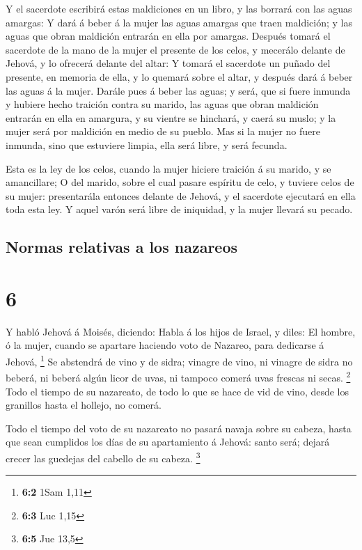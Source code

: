  Y el sacerdote escribirá estas maldiciones en un libro, y
las borrará con las aguas amargas:  Y dará á beber á la
mujer las aguas amargas que traen maldición; y las aguas que obran
maldición entrarán en ella por amargas.  Después tomará el
sacerdote de la mano de la mujer el presente de los celos, y mecerálo
delante de Jehová, y lo ofrecerá delante del altar:  Y
tomará el sacerdote un puñado del presente, en memoria de ella, y lo
quemará sobre el altar, y después dará á beber las aguas á la mujer.
 Darále pues á beber las aguas; y será, que si fuere
inmunda y hubiere hecho traición contra su marido, las aguas que obran
maldición entrarán en ella en amargura, y su vientre se hinchará, y
caerá su muslo; y la mujer será por maldición en medio de su pueblo.
 Mas si la mujer no fuere inmunda, sino que estuviere
limpia, ella será libre, y será fecunda.

 Esta es la ley de los celos, cuando la mujer hiciere
traición á su marido, y se amancillare;  O del marido,
sobre el cual pasare espíritu de celo, y tuviere celos de su mujer:
presentarála entonces delante de Jehová, y el sacerdote ejecutará en
ella toda esta ley.  Y aquel varón será libre de iniquidad,
y la mujer llevará su pecado.

\hypertarget{normas-relativas-a-los-nazareos}{%
\subsection{Normas relativas a los
nazareos}\label{normas-relativas-a-los-nazareos}}

\hypertarget{section-5}{%
\section{6}\label{section-5}}

 Y habló Jehová á Moisés, diciendo:  Habla á los
hijos de Israel, y diles: El hombre, ó la mujer, cuando se apartare
haciendo voto de Nazareo, para dedicarse á Jehová, \footnote{\textbf{6:2}
  1Sam 1,11}  Se abstendrá de vino y de sidra; vinagre de
vino, ni vinagre de sidra no beberá, ni beberá algún licor de uvas, ni
tampoco comerá uvas frescas ni secas. \footnote{\textbf{6:3} Luc 1,15}
 Todo el tiempo de su nazareato, de todo lo que se hace de
vid de vino, desde los granillos hasta el hollejo, no comerá.

 Todo el tiempo del voto de su nazareato no pasará navaja
sobre su cabeza, hasta que sean cumplidos los días de su apartamiento á
Jehová: santo será; dejará crecer las guedejas del cabello de su cabeza.
\footnote{\textbf{6:5} Jue 13,5}

